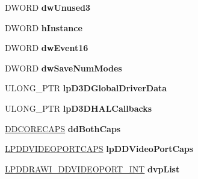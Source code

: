 \begin{DoxyCompactItemize}
D\+W\+O\+RD {\bfseries dw\+Unused3}
\item 
\mbox{\label{struct___d_d_r_a_w_i___d_i_r_e_c_t_d_r_a_w___g_b_l_a0c427d0436c13434ca7bc60ed6ed4fd4}} 
D\+W\+O\+RD {\bfseries h\+Instance}
\item 
\mbox{\label{struct___d_d_r_a_w_i___d_i_r_e_c_t_d_r_a_w___g_b_l_af0a290403eca5f773af613894ffebab4}} 
D\+W\+O\+RD {\bfseries dw\+Event16}
\item 
\mbox{\label{struct___d_d_r_a_w_i___d_i_r_e_c_t_d_r_a_w___g_b_l_abd071cc57cba42a9ba27f76270518f88}} 
D\+W\+O\+RD {\bfseries dw\+Save\+Num\+Modes}
\item 
\mbox{\label{struct___d_d_r_a_w_i___d_i_r_e_c_t_d_r_a_w___g_b_l_a8c3ca12350e90abf3576aad9ae2e12c6}} 
U\+L\+O\+N\+G\+\_\+\+P\+TR {\bfseries lp\+D3\+D\+Global\+Driver\+Data}
\item 
\mbox{\label{struct___d_d_r_a_w_i___d_i_r_e_c_t_d_r_a_w___g_b_l_a0e59781fc03bf6d5467f536269022eba}} 
U\+L\+O\+N\+G\+\_\+\+P\+TR {\bfseries lp\+D3\+D\+H\+A\+L\+Callbacks}
\item 
\mbox{\label{struct___d_d_r_a_w_i___d_i_r_e_c_t_d_r_a_w___g_b_l_a4bcb3d44d4f91956f5362ea5fcdf2514}} 
\hyperlink{struct___d_d_c_o_r_e_c_a_p_s}{D\+D\+C\+O\+R\+E\+C\+A\+PS} {\bfseries dd\+Both\+Caps}
\item 
\mbox{\label{struct___d_d_r_a_w_i___d_i_r_e_c_t_d_r_a_w___g_b_l_a6b9ade88a3390dc88cbb9af03f8d2098}} 
\hyperlink{struct___d_d_v_i_d_e_o_p_o_r_t_c_a_p_s}{L\+P\+D\+D\+V\+I\+D\+E\+O\+P\+O\+R\+T\+C\+A\+PS} {\bfseries lp\+D\+D\+Video\+Port\+Caps}
\item 
\mbox{\label{struct___d_d_r_a_w_i___d_i_r_e_c_t_d_r_a_w___g_b_l_a1e172323272665550dc1045d929c4488}} 
\hyperlink{struct___d_d_r_a_w_i___d_d_v_i_d_e_o_p_o_r_t___i_n_t}{L\+P\+D\+D\+R\+A\+W\+I\+\_\+\+D\+D\+V\+I\+D\+E\+O\+P\+O\+R\+T\+\_\+\+I\+NT} {\bfseries dvp\+List}

\end{DoxyCompactItemize}
